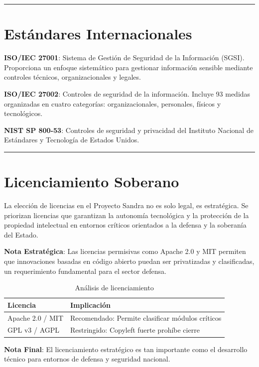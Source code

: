 \documentclass[11pt, spanish, letterpaper, openany]{book}
\newcommand{\separador}{
    \vspace{1ex}
    \begin{center}
        \color{sandraTeal}\rule{0.12\linewidth}{0.5pt}
    \end{center}
    \vspace{1ex}
}
\begin{document}
\separador

\section{Estándares Internacionales}

\begin{estandarISO}
    \textbf{ISO/IEC 27001}: Sistema de Gestión de Seguridad de la Información (SGSI). Proporciona un enfoque sistemático para gestionar información sensible mediante controles técnicos, organizacionales y legales.
\end{estandarISO}

\begin{estandarISO}
    \textbf{ISO/IEC 27002}: Controles de seguridad de la información. Incluye 93 medidas organizadas en cuatro categorías: organizacionales, personales, físicos y tecnológicos.
\end{estandarISO}

\begin{estandarISO}
    \textbf{NIST SP 800-53}: Controles de seguridad y privacidad del Instituto Nacional de Estándares y Tecnología de Estados Unidos.
\end{estandarISO}

\separador

\section{Licenciamiento Soberano}

La elección de licencias en el Proyecto Sandra no es solo legal, es estratégica. Se priorizan licencias que garantizan la autonomía tecnológica y la protección de la propiedad intelectual en entornos críticos orientados a la defensa y la soberanía del Estado.

\begin{alertaISO}
    \textbf{Nota Estratégica}: Las licencias permisivas como Apache 2.0 y MIT permiten que innovaciones basadas en código abierto puedan ser privatizadas y clasificadas, un requerimiento fundamental para el sector defensa.
\end{alertaISO}

\begin{table}
    \centering
    \small
    \caption{Análisis de licenciamiento}
    \begin{tabular}{lp{5cm}}
        \toprule
        \textbf{Licencia} & \textbf{Implicación} \\
        \midrule
        Apache 2.0 / MIT & Recomendado: Permite clasificar módulos críticos \\
        GPL v3 / AGPL & Restringido: Copyleft fuerte prohíbe cierre \\
        \bottomrule
    \end{tabular}
\end{table}

\begin{notaeditorial}
    \textbf{Nota Final}: El licenciamiento estratégico es tan importante como el desarrollo técnico para entornos de defensa y seguridad nacional.
\end{notaeditorial}
\end{document}
